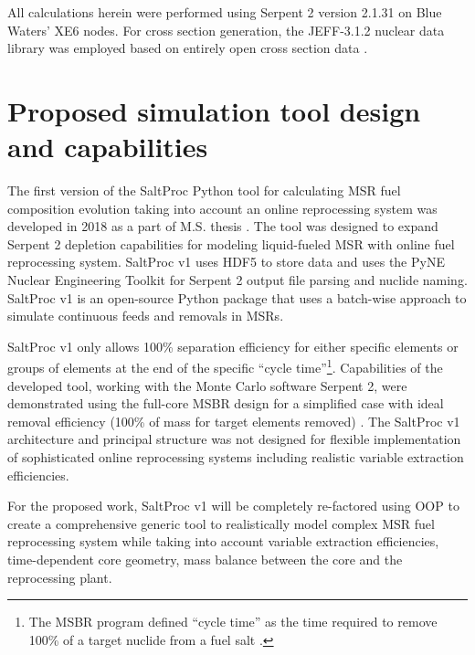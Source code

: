All calculations herein were performed using Serpent 2 version 2.1.31 on Blue 
Waters’ XE6 nodes. For cross section generation, the JEFF-3.1.2 nuclear data 
library was employed based on entirely open cross section data 
\cite{oecd/nea_data_bank_jeff-3.1.2_2014}. 

\section{Proposed simulation tool design and capabilities} \label{sec:tool_design}
The first version of the SaltProc Python tool for calculating \gls{MSR} fuel 
composition evolution taking into account an online reprocessing system 
was developed in 2018 as a part of M.S. thesis \cite{rykhlevskii_advanced_2018,
	rykhlevskii_arfc/saltproc_2018}. The tool was designed to 
expand Serpent 2 depletion capabilities for modeling liquid-fueled \gls{MSR} 
with online fuel reprocessing system. SaltProc v1 uses HDF5 
\cite{the_hdf_group_hierarchical_1997} to store 
data and uses the PyNE Nuclear Engineering Toolkit \cite{scopatz_pyne_2012}
for Serpent 2 output file parsing and nuclide naming. SaltProc v1 is an 
open-source Python package that uses a batch-wise approach to simulate 
continuous feeds and removals in \glspl{MSR}. 

SaltProc v1 only allows 100\% separation efficiency for either specific 
elements or groups of elements at the end of the specific ``cycle 
time''\footnote{The \gls{MSBR} program defined ``cycle time'' as the time 
required to remove 100\% of a target nuclide from a fuel salt 
\cite{robertson_conceptual_1971}.}. Capabilities of the developed tool, 
working with the Monte Carlo software Serpent 2, were demonstrated using the 
full-core MSBR design for a simplified case with ideal removal efficiency 
(100\% of mass for target elements removed) \cite{rykhlevskii_modeling_2019}. 
The SaltProc v1 architecture and principal structure was not designed for 
flexible implementation of sophisticated online reprocessing systems including 
realistic variable extraction efficiencies. 

For the proposed work, SaltProc v1 will be completely re-factored using 
\gls{OOP} to create a comprehensive generic tool to realistically model 
complex \gls{MSR} fuel reprocessing system while taking into account 
variable extraction efficiencies, time-dependent core geometry, mass balance 
between the core and the reprocessing plant.


